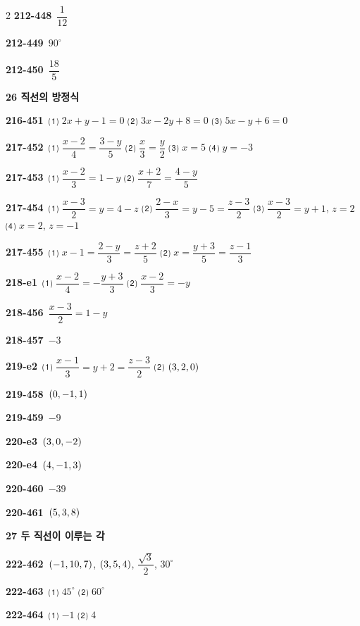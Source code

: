 \documentclass[10pt,a4paper]{article}
\begin{document}
\begin{multicols}{2}
\noindent\textbf{212-448}\ $\dfrac{1}{12}$\par
\noindent\textbf{212-449}\ $90^\circ$\par
\noindent\textbf{212-450}\ $\dfrac{18}{5}$\par
\noindent\textbf{26 직선의 방정식}\par\smallskip
\noindent\textbf{216-451}\ ⑴ $2x+y-1=0$ ⑵ $3x-2y+8=0$ ⑶ $5x-y+6=0$\par
\noindent\textbf{217-452}\ ⑴ $\dfrac{x-2}{4}=\dfrac{3-y}{5}$ ⑵ $\dfrac{x}{3}=\dfrac{y}{2}$ ⑶ $x=5$ ⑷ $y=-3$\par
\noindent\textbf{217-453}\ ⑴ $\dfrac{x-2}{3}=1-y$ ⑵ $\dfrac{x+2}{7}=\dfrac{4-y}{5}$\par
\noindent\textbf{217-454}\ ⑴ $\dfrac{x-3}{2}=y=4-z$ ⑵ $\dfrac{2-x}{3}=y-5=\dfrac{z-3}{2}$ ⑶ $\dfrac{x-3}{2}=y+1$, $z=2$ ⑷ $x=2$, $z=-1$\par
\noindent\textbf{217-455}\ ⑴ $x-1=\dfrac{2-y}{3}=\dfrac{z+2}{5}$ ⑵ $x=\dfrac{y+3}{5}=\dfrac{z-1}{3}$\par
\noindent\textbf{218-e1}\ ⑴ $\dfrac{x-2}{4}=-\dfrac{y+3}{3}$ ⑵ $\dfrac{x-2}{3}=-y$\par
\noindent\textbf{218-456}\ $\dfrac{x-3}{2}=1-y$\par
\noindent\textbf{218-457}\ $-3$\par
\noindent\textbf{219-e2}\ ⑴ $\dfrac{x-1}{3}=y+2=\dfrac{z-3}{2}$ ⑵ $(3{,}\mkern3mu\mathopen{}2{,}\mkern3mu\mathopen{}0)$\par
\noindent\textbf{219-458}\ $(0{,}\mkern3mu\mathopen{}-1{,}\mkern3mu\mathopen{}1)$\par
\noindent\textbf{219-459}\ $-9$\par
\noindent\textbf{220-e3}\ $(3{,}\mkern3mu\mathopen{}0{,}\mkern3mu\mathopen{}-2)$\par
\noindent\textbf{220-e4}\ $(4{,}\mkern3mu\mathopen{}-1{,}\mkern3mu\mathopen{}3)$\par
\noindent\textbf{220-460}\ $-39$\par
\noindent\textbf{220-461}\ $(5{,}\mkern3mu\mathopen{}3{,}\mkern3mu\mathopen{}8)$\par
\noindent\textbf{27 두 직선이 이루는 각}\par\smallskip
\noindent\textbf{222-462}\ $(-1{,}\mkern3mu\mathopen{}10{,}\mkern3mu\mathopen{}7)$, $(3{,}\mkern3mu\mathopen{}5{,}\mkern3mu\mathopen{}4)$, $\dfrac{\sqrt{3}}{2}$, $30^\circ$\par
\noindent\textbf{222-463}\ ⑴ $45^\circ$ ⑵ $60^\circ$\par
\noindent\textbf{222-464}\ ⑴ $-1$ ⑵ $4$\par

\end{multicols}
\end{document}

